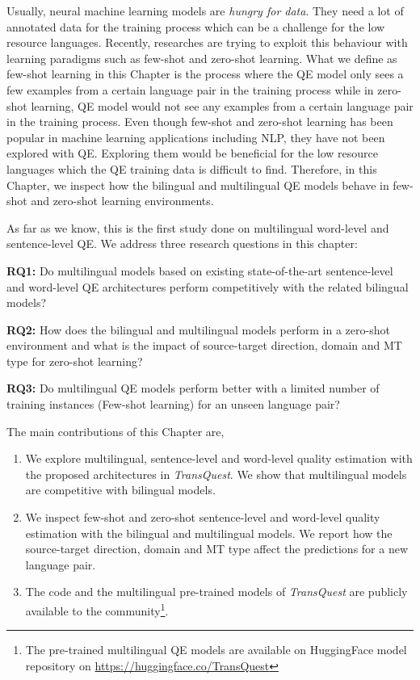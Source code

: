 Usually, neural machine learning models are \textit{hungry for data}. They need a lot of annotated data for the training process which can be a challenge for the low resource languages. Recently, researches are trying to exploit this behaviour with learning paradigms such as few-shot and zero-shot learning.  What we define as few-shot learning in this Chapter is the process where the QE model only sees a few examples from a certain language pair in the training process \autocite{10.1145/3386252} while in zero-shot learning, QE model would not see any examples from a certain language pair \autocite{10.5555/1620163.1620201} in the training process. Even though few-shot and zero-shot learning has been popular in machine learning applications including NLP, they have not been explored with QE. Exploring them would be beneficial for the low resource languages which the QE training data is difficult to find. Therefore, in this Chapter, we inspect how the bilingual and multilingual QE models behave in few-shot and zero-shot learning environments.


As far as we know, this is the first study done on multilingual word-level and sentence-level QE. We address three research questions in this chapter:

\textbf{RQ1:} Do multilingual models based on existing state-of-the-art sentence-level and word-level QE architectures perform competitively with the related bilingual models?

\textbf{RQ2:} How does the bilingual and multilingual models perform in a zero-shot environment and what is the impact of source-target direction, domain and MT type for zero-shot learning?

\textbf{RQ3:} Do multilingual QE models perform better with a limited number of training instances (Few-shot learning) for an unseen language pair?


The main contributions of this Chapter are, 

\begin{enumerate}

\item We explore multilingual, sentence-level and word-level quality estimation with the proposed architectures in \textit{TransQuest}. We show that multilingual models are competitive with bilingual models.

\item We inspect few-shot and zero-shot sentence-level and word-level quality estimation with the bilingual and multilingual models. We report how the source-target direction, domain and MT type affect the predictions for a new language pair.

\item The code and the multilingual pre-trained models of \textit{TransQuest} are publicly available to the community\footnote{The pre-trained multilingual QE models are available on HuggingFace model repository on \url{https://huggingface.co/TransQuest}}.

\end{enumerate} 

